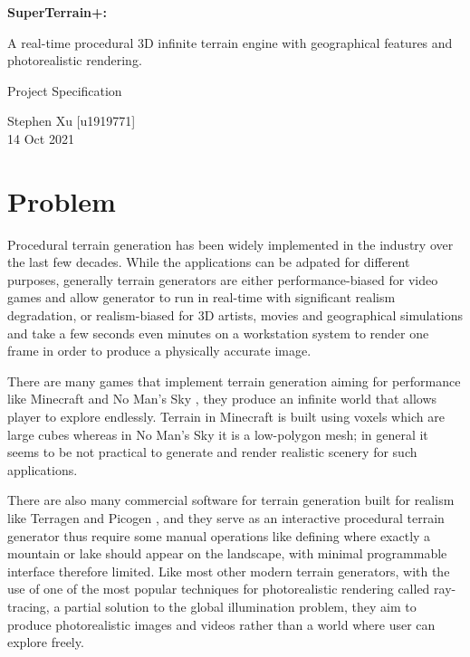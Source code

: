 \documentclass[oneside, a4paper]{article}
\begin{document}
    \begin{titlepage}
        \begin{center}
            \huge
            \vspace*{4cm}
            \textbf{SuperTerrain+:}
            
            \vspace*{1cm}
            A real-time procedural 3D infinite terrain engine with geographical features and photorealistic rendering.

            \LARGE
            \vspace*{2cm}
            Project Specification

            \vspace*{1cm}
            Stephen Xu [u1919771] \\
            14 Oct 2021
        \end{center}
    \end{titlepage}
    \newpage
    \large
    \flushleft
    
    \section{Problem}

    Procedural terrain generation has been widely implemented in the industry over the last few decades. While the applications can be adpated for different purposes, generally terrain generators are either performance-biased for video games and allow generator to run in real-time with significant realism degradation, or realism-biased for 3D artists, movies and geographical simulations and take a few seconds even minutes on a workstation system to render one frame in order to produce a physically accurate image.

    There are many games that implement terrain generation aiming for performance like Minecraft \cite{mc} and No Man's Sky \cite{no_mans_sky}, they produce an infinite world that allows player to explore endlessly. Terrain in Minecraft is built using voxels which are large cubes whereas in No Man's Sky it is a low-polygon mesh; in general it seems to be not practical to generate and render realistic scenery for such applications.
    
    There are also many commercial software for terrain generation built for realism like Terragen \cite{terragen} and Picogen \cite{picogen}, and they serve as an interactive procedural terrain generator thus require some manual operations like defining where exactly a mountain or lake should appear on the landscape, with minimal programmable interface therefore limited. Like most other modern terrain generators, with the use of one of the most popular techniques for photorealistic rendering called ray-tracing, a partial solution to the global illumination problem, they aim to produce photorealistic images and videos rather than a world where user can explore freely.
\end{document}
